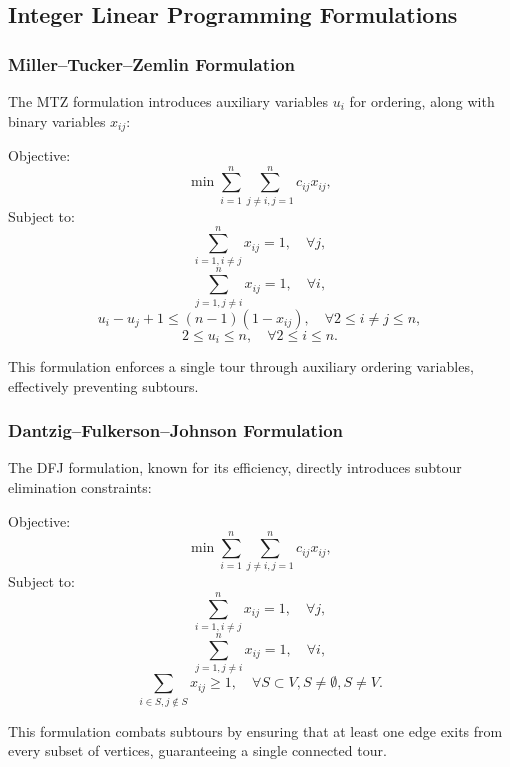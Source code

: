 \subsection{Integer Linear Programming Formulations}

\subsubsection{Miller–Tucker–Zemlin Formulation}

The \Gls{MTZ} formulation introduces auxiliary variables \(u_i\) for ordering, along with binary variables \(x_{ij}\):

Objective:
\[
	\min \sum_{i=1}^{n} \sum_{j \ne i, j=1}^{n} c_{ij} x_{ij},
\]
Subject to:
\[
	\sum_{i=1, i \ne j}^{n} x_{ij} = 1, \quad \forall j,
\]
\[
	\sum_{j=1, j \ne i}^{n} x_{ij} = 1, \quad \forall i,
\]
\[
	u_i - u_j + 1 \le (n-1)(1 - x_{ij}), \quad \forall 2 \le i \ne j \le n,
\]
\[
	2 \le u_i \le n, \quad \forall 2 \le i \le n.
\]

This formulation enforces a single tour through auxiliary ordering variables, effectively preventing subtours.

\subsubsection{Dantzig–Fulkerson–Johnson Formulation}

The DFJ formulation, known for its efficiency, directly introduces subtour elimination constraints:

Objective:
\[
	\min \sum_{i=1}^{n} \sum_{j \ne i, j=1}^{n} c_{ij} x_{ij},
\]
Subject to:
\[
	\sum_{i=1, i \ne j}^{n} x_{ij} = 1, \quad \forall j,
\]
\[
	\sum_{j=1, j \ne i}^{n} x_{ij} = 1, \quad \forall i,
\]
\[
	\sum_{i \in S, j \notin S} x_{ij} \ge 1, \quad \forall S \subset V, S \ne \emptyset, S \ne V.
\]


This formulation combats subtours by ensuring that at least one edge exits from every subset of vertices, guaranteeing a single connected tour.


